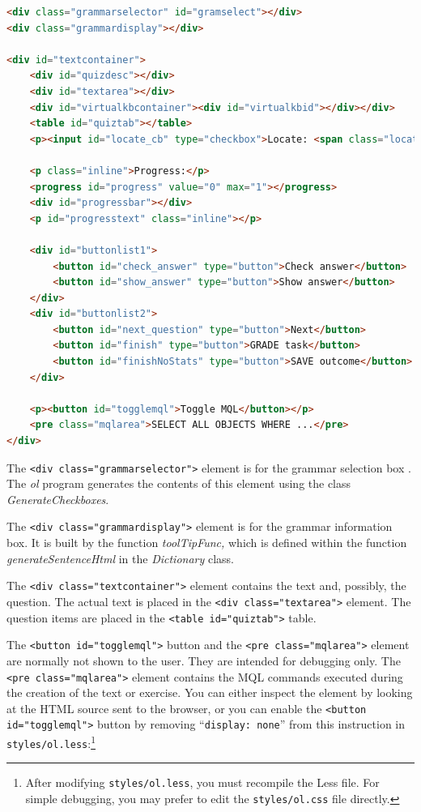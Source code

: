 \documentclass[11pt,oneside,a4paper]{memoir}
\newcommand*{\xml}[1]{\texttt{<#1>}}
\begin{document}
\begin{lstlisting}[language=HTML,morekeywords={progress}]
<div class="grammarselector" id="gramselect"></div>
<div class="grammardisplay"></div>
 
<div id="textcontainer">
    <div id="quizdesc"></div>
    <div id="textarea"></div>
    <div id="virtualkbcontainer"><div id="virtualkbid"></div></div>
    <table id="quiztab"></table>
    <p><input id="locate_cb" type="checkbox">Locate: <span class="location"></span></p>

    <p class="inline">Progress:</p>
    <progress id="progress" value="0" max="1"></progress>
    <div id="progressbar"></div>
    <p id="progresstext" class="inline"></p>

    <div id="buttonlist1">
        <button id="check_answer" type="button">Check answer</button>
        <button id="show_answer" type="button">Show answer</button>
    </div>
    <div id="buttonlist2">
        <button id="next_question" type="button">Next</button>
        <button id="finish" type="button">GRADE task</button>
        <button id="finishNoStats" type="button">SAVE outcome</button>
    </div>

    <p><button id="togglemql">Toggle MQL</button></p>
    <pre class="mqlarea">SELECT ALL OBJECTS WHERE ...</pre>
</div>
\end{lstlisting}
  
The \xml{div class="grammarselector"} element is for the grammar selection box%
.
The \emph{ol} program generates the contents of this element using the class
\emph{GenerateCheckboxes}.

The \xml{div class="grammardisplay"} element is for the grammar information box.%
It is built by the function \emph{toolTipFunc,} which is defined within the function
\emph{generateSentenceHtml} in the \emph{Dictionary} class.

The \xml{div class="textcontainer"} element contains the text and, possibly, the question. The
actual text is placed in the \xml{div class="textarea"} element. The question items are placed
in the \xml{table id="quiztab"} table.

The \xml{button id="togglemql"} button and the \xml{pre class="mqlarea"} element are normally not
shown to the user. They are intended for debugging only. The \xml{pre class="mqlarea"} element
contains the MQL commands executed during the creation of the text
or exercise. You can either inspect the element by looking at the HTML source sent to the browser,
or you can enable the \xml{button id="togglemql"} button by removing ``\texttt{display:~none}'' from
this instruction in \texttt{styles/ol.less}:\footnote{After modifying \texttt{styles/ol.less}, you
  must recompile the Less file. For simple debugging, you may prefer to edit the
  \texttt{styles/ol.css} file directly.}
\end{document}
